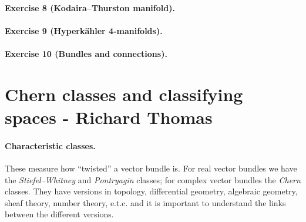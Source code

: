\documentclass{article}
\theoremstyle{definition}
\begin{document}
\paragraph{Exercise 8 {\normalfont(Kodaira--Thurston manifold)}.} 

\paragraph{Exercise 9 {\normalfont(Hyperk\"ahler 4-manifolds)}.} 

\paragraph{Exercise 10 {\normalfont(Bundles and connections)}.} 

\newpage

\section{Chern classes and classifying spaces - Richard Thomas}

\paragraph{Characteristic classes.} These measure how ``twisted'' a vector
bundle is. For real vector bundles we have the \emph{Stiefel--Whitney} and
\emph{Pontryagin} classes; for complex vector bundles the \emph{Chern} classes.
They have versions in topology, differential geometry, algebraic geometry, sheaf
theory, number theory, e.t.c. and it is important to understand the links
between the different versions.
\end{document}
